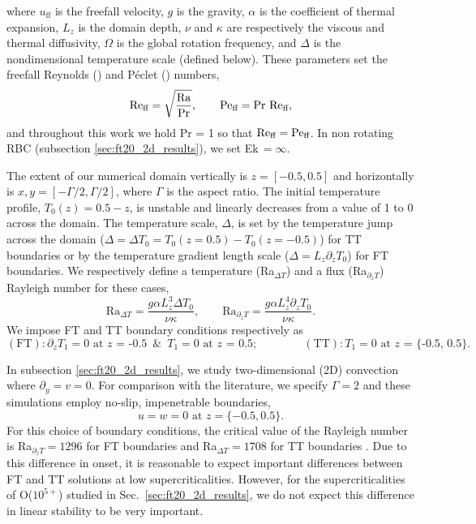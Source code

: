where $u_{\text{ff}}$ is the freefall velocity, $g$ is the gravity, $\alpha$ is the coefficient of thermal expansion, $L_z$ is the domain depth, $\nu$ and $\kappa$ are respectively the viscous and thermal diffusivity, $\Omega$ is the global rotation frequency, and $\Delta$ is the nondimensional temperature scale (defined below).
These parameters set the freefall Reynolds (\Reff) and P\'{e}clet (\Peff) numbers, 
\begin{equation}
\text{Re}_{\text{ff}} = \sqrt{\frac{\text{Ra}}{\text{Pr}}},\qquad
\text{Pe}_{\text{ff}} = \text{Pr }\text{Re}_{\text{ff}},
\end{equation}
and throughout this work we hold Pr = 1 so that $\text{Re}_{\text{ff}} = \text{Pe}_{\text{ff}}$.
In non rotating RBC (subsection \ref{sec:ft20_2d_results}), we set Ek$\,= \infty$.

The extent of our numerical domain vertically is $z = [-0.5, 0.5]$ and horizontally is $x, y = [-\Gamma/2, \Gamma/2]$, where $\Gamma$ is the aspect ratio.
The initial temperature profile, $T_0(z) = 0.5 - z$, is unstable and linearly decreases from a value of 1 to 0 across the domain. 
The temperature scale, $\Delta$, is set by the temperature jump across the domain ($\Delta = \Delta T_0 =  T_0(z=0.5)-T_0(z=-0.5)$) for TT boundaries or by the temperature gradient length scale ($\Delta = L_z \partial_z T_0$) for FT boundaries.
We respectively define a temperature (Ra$_{\Delta T}$) and a flux (Ra$_{\partial_z T}$) Rayleigh number for these cases,
\begin{equation}
\text{Ra}_{\Delta T} = \frac{g \alpha L_z^3 \Delta T_0}{\nu\kappa}, \qquad 
\text{Ra}_{\partial_z T} = \frac{g \alpha L_z^4 \partial_z T_0}{\nu\kappa}.
\end{equation}
We impose FT and TT boundary conditions respectively as
\begin{equation}
(\text{FT}): \partial_z T_1 = 0 \text{ at $z$ = -0.5} \,\,\,\&\,\,\, T_1 = 0 \text{ at $z$ = 0.5};\qquad\qquad
(\text{TT}): T_1 = 0 \text{ at $z$ = \{-0.5, 0.5\}}.
\end{equation}

In subsection \ref{sec:ft20_2d_results}, we study two-dimensional (2D) convection where $\partial_y = v = 0$.
For comparison with the literature, we specify $\Gamma = 2$ and these simulations employ no-slip, impenetrable boundaries,
\begin{equation}
u = w = 0 \, \, \text{at}\,\,z = \{-0.5, 0.5\}.
\label{eqn:vel_bcs}
\end{equation}
For this choice of boundary conditions, the critical value of the Rayleigh number is Ra$_{\partial_z T} = 1296$ for FT boundaries and Ra$_{\Delta T} = 1708$ for TT boundaries \citep{goluskin2016}.
Due to this difference in onset, it is reasonable to expect important differences between FT and TT solutions at low supercriticalities.
However, for the supercriticalities of O($10^{5+}$) studied in Sec.~\ref{sec:ft20_2d_results}, we do not expect this difference in linear stability to be very important.

